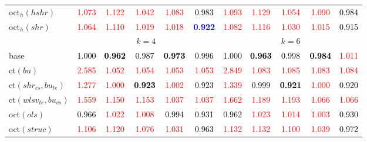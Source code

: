 \begin{tabular}[t]{l|>{}cccc>{}c|ccccc}
oct$_h(hshr)$ & \textcolor{red}{1.073} & \textcolor{red}{1.122} & \textcolor{red}{1.042} & \textcolor{red}{1.083} & \textcolor{black}{0.983} & \textcolor{red}{1.093} & \textcolor{red}{1.129} & \textcolor{red}{1.054} & \textcolor{red}{1.090} & \textcolor{black}{0.984}\\
oct$_h(shr)$ & \textcolor{red}{1.064} & \textcolor{red}{1.110} & \textcolor{red}{1.019} & \textcolor{red}{1.018} & \textcolor{blue}{\textbf{0.922}} & \textcolor{red}{1.082} & \textcolor{red}{1.116} & \textcolor{red}{1.030} & \textcolor{red}{1.015} & \textcolor{black}{0.915}\\
\addlinespace[0.3em]
\multicolumn{1}{c}{} & \multicolumn{5}{c}{\textbf{$k = 4$}} & \multicolumn{5}{c}{\textbf{$k = 6$}}\\
base & \textcolor{black}{1.000} & \textcolor{black}{\textbf{0.962}} & \textcolor{black}{0.987} & \textcolor{black}{\textbf{0.973}} & \textcolor{black}{0.996} & \textcolor{black}{1.000} & \textcolor{black}{\textbf{0.963}} & \textcolor{black}{0.998} & \textcolor{black}{\textbf{0.984}} & \textcolor{red}{1.011}\\
ct$(bu)$ & \textcolor{red}{2.585} & \textcolor{red}{1.052} & \textcolor{red}{1.054} & \textcolor{red}{1.053} & \textcolor{red}{1.053} & \textcolor{red}{2.849} & \textcolor{red}{1.083} & \textcolor{red}{1.085} & \textcolor{red}{1.083} & \textcolor{red}{1.084}\\
ct$(shr_{cs}, bu_{te})$ & \textcolor{red}{1.277} & \textcolor{red}{1.000} & \textcolor{black}{\textbf{0.923}} & \textcolor{red}{1.002} & \textcolor{black}{0.923} & \textcolor{red}{1.339} & \textcolor{black}{0.999} & \textcolor{black}{\textbf{0.921}} & \textcolor{red}{1.000} & \textcolor{black}{0.920}\\
ct$(wlsv_{te}, bu_{cs})$ & \textcolor{red}{1.559} & \textcolor{red}{1.150} & \textcolor{red}{1.153} & \textcolor{red}{1.037} & \textcolor{red}{1.037} & \textcolor{red}{1.662} & \textcolor{red}{1.189} & \textcolor{red}{1.193} & \textcolor{red}{1.066} & \textcolor{red}{1.066}\\
oct$(ols)$ & \textcolor{black}{0.966} & \textcolor{red}{1.022} & \textcolor{red}{1.008} & \textcolor{black}{0.994} & \textcolor{black}{0.931} & \textcolor{black}{0.962} & \textcolor{red}{1.023} & \textcolor{red}{1.014} & \textcolor{red}{1.003} & \textcolor{black}{0.930}\\
oct$(struc)$ & \textcolor{red}{1.106} & \textcolor{red}{1.120} & \textcolor{red}{1.076} & \textcolor{red}{1.031} & \textcolor{black}{0.963} & \textcolor{red}{1.132} & \textcolor{red}{1.132} & \textcolor{red}{1.100} & \textcolor{red}{1.039} & \textcolor{black}{0.972}\\

\end{tabular}

